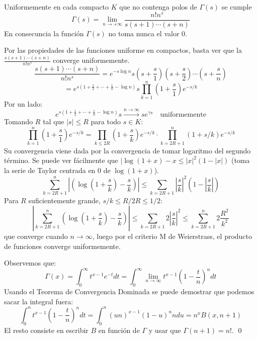 \documentclass[TAN.tex]{subfiles}
\begin{document}
\begin{prop} Uniformemente en cada compacto $K$ que no contenga polos de $Γ(s)$ se cumple
\[ Γ(s) = \lim_{n\to+∞} \frac{n!n^s}{s(s+1)\cdots(s+n)} \]
En consecuncia la función $Γ(s)$ no toma nunca el valor 0.
\end{prop}
\begin{dem}
Por las propiedades de las funciones uniforme en compactos, basta ver que la $\frac{s(s+1)\cdots(s+n)}{n!n^s}$ converge uniformemente.
\[ \frac{s(s+1)\cdots(s+n)}{n!n^s} = e^{-s \log n} s \left(s + \frac{s}{1}\right)\left(s + \frac{s}{2}\right)\cdots \left(s + \frac{s}{n}\right)\]
\[ = e^{s(1+\frac{1}{2}+\cdots+\frac{1}{n}-\log n)}s\prod_{k=1}^n\left(1+\frac{s}{1}\right)e^{-s/k}\]
Por un lado:
\[ e^{s(1+\frac{1}{2}+\cdots+\frac{1}{n}-\log n)}s \xrightarrow{n\to∞} se^{γs} \quad \text{uniformemente} \]
Tomando $R$ tal que $|s|≤R$ para todo $s \in K$:
\[\prod_{k=1}^n\left(1+\frac{s}{1}\right)e^{-s/k} = \prod_{k≤2R} \left(1+\frac{s}{k}\right)e^{-s/k} \cdot \prod_{k=2R+1}^n \left(1+s/k\right)e^{-s/k} \]
Su convergencia viene dada por la convergencia de tomar logaritmo del segundo término. Se puede ver fácilmente que $|\log(1+x)-x ≤ |x|^2(1-|x|)$ (toma la serie de Taylor centrada en $0$ de $\log(1+x)$).
\[ \sum_{k=2R+1}^n \left|\left(\log(1+\frac{s}{k})-\frac{s}{k}\right)\right| ≤ \sum_{k=2R+1} \left|\frac{s}{k}\right|^2\left(1-\left|\frac{s}{k}\right|\right) \]
Para $R$ suficientemente grande, $s/k ≤ R/2R ≤ 1/2$:
\[ \left|\sum_{k=2R+1}^n \left(\log(1+\frac{s}{k}) - \frac{s}{k}\right)\right| ≤ \sum_{k=2R+1} 2\left|\frac{s}{k}\right|^2 ≤ \sum_{k=2R+1}^n 2 \frac{R^2}{k^2} \]
que converge cuando $n \to ∞$, luego por el criterio M de Weierstrass, el producto de funciones converge uniformemente.

Observemos que:
\[ Γ(x) = \int_0^{∞} t^{x-1} e^{-t} dt =  \int_0^{∞} \lim_{n\to ∞} t^{x-1}\left(1-\frac{t}{n}\right)^n dt \]
Usando el Teorema de Convergencia Dominada se puede demostrar que podemos sacar la integral fuera:
\[ \int_0^n t^{x-1}\left(1-\frac{t}{n}\right)^n dt = \int_0^n (un)^{x-1}(1-u)^n ndu = n^x B(x,n+1) \]
El resto consiste en escribir $B$ en función de $Γ$ y usar que $Γ(n+1)=n!$.
\qed
\end{dem}
\end{document}
